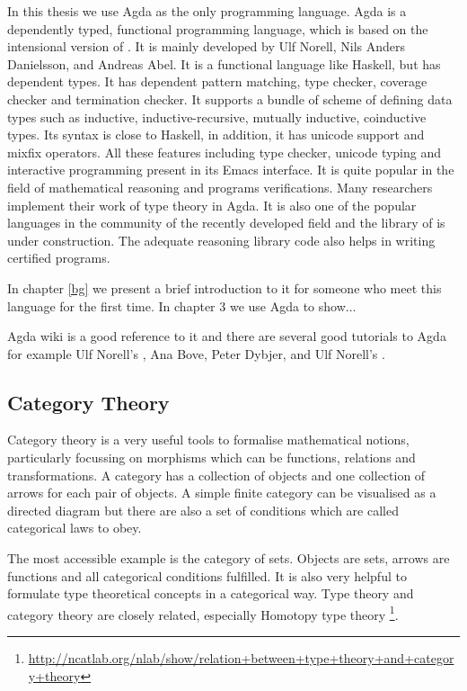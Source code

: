 In this thesis we use Agda as the only programming language. Agda is a dependently typed, functional programming language, which is
based on the intensional version of \mltt. It is mainly developed by
Ulf Norell, Nils Anders Danielsson, and Andreas Abel.
It is a functional language like Haskell, but has dependent types. It has dependent pattern
matching, type checker, coverage checker and termination checker. It
supports a bundle of scheme of defining data types such as inductive, inductive-recursive, mutually inductive,
coinductive types. Its syntax is close to Haskell, in addition, it has
unicode support and mixfix operators. All these features including
type checker, unicode typing and interactive programming present in
its Emacs interface. It is quite popular in the field of mathematical reasoning and programs
verifications. Many researchers implement their work of type theory in
Agda. It is also one of the popular languages in the community of the recently
developed field \hott and the library of \hott is under construction.
The adequate reasoning library code also helps in writing certified programs.

In chapter \ref{bg} we present a brief introduction to it for someone
who meet this language for the first time. In chapter 3 we use Agda to
show...

Agda wiki\cite{agdawiki:main} is a good reference to it and there are
several good tutorials to Agda for example Ulf Norell's
\cite{tutorial}, Ana Bove, Peter Dybjer, and Ulf Norell's \cite{bove2009brief}.




\subsection{Category Theory}

Category theory is a very useful tools to formalise mathematical notions, particularly focussing on morphisms which can be functions, relations and transformations.
A category has a collection of objects and one collection of arrows for each pair of objects. A simple finite category can be visualised as a directed diagram but there are also a set of conditions which are called categorical laws to obey. 

The most accessible example is the category of sets. Objects are sets, arrows are functions and all categorical conditions fulfilled. It is also very helpful to formulate type theoretical concepts in a categorical way. Type theory and category theory are closely related, especially Homotopy type theory \footnote{\url{http://ncatlab.org/nlab/show/relation+between+type+theory+and+category+theory}}.

